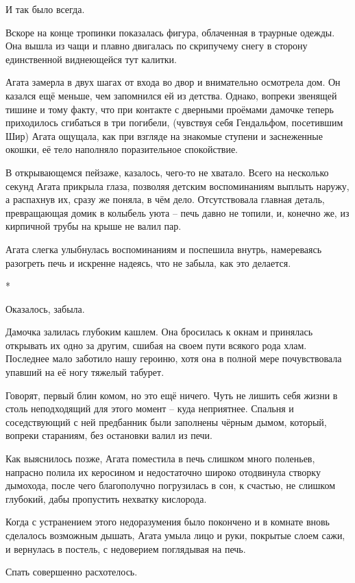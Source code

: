 \documentclass[
  a5paperpaper,
  DIV=11,
  numbers=noendperiod]{scrreprt}
\begin{document}
И так было всегда.

Вскоре на конце тропинки показалась фигура, облаченная в траурные
одежды. Она вышла из чащи и плавно двигалась по скрипучему снегу в
сторону единственной виднеющейся тут калитки.

Агата замерла в двух шагах от входа во двор и внимательно осмотрела дом.
Он казался ещё меньше, чем запомнился ей из детства. Однако, вопреки
звенящей тишине и тому факту, что при контакте с дверными проёмами
дамочке теперь приходилось сгибаться в три погибели, (чувствуя себя
Гендальфом, посетившим Шир) Агата ощущала, как при взгляде на знакомые
ступени и заснеженные окошки, её тело наполняло поразительное
спокойствие.

В открывающемся пейзаже, казалось, чего-то не хватало. Всего на
несколько секунд Агата прикрыла глаза, позволяя детским воспоминаниям
выплыть наружу, а распахнув их, сразу же поняла, в чём дело.
Отсутствовала главная деталь, превращающая домик в колыбель уюта -- печь
давно не топили, и, конечно же, из кирпичной трубы на крыше не валил
пар.

Агата слегка улыбнулась воспоминаниям и поспешила внутрь, намереваясь
разогреть печь и искренне надеясь, что не забыла, как это делается.

*

Оказалось, забыла.

Дамочка залилась глубоким кашлем. Она бросилась к окнам и принялась
открывать их одно за другим, сшибая на своем пути всякого рода хлам.
Последнее мало заботило нашу героиню, хотя она в полной мере
почувствовала упавший на её ногу тяжелый табурет.

Говорят, первый блин комом, но это ещё ничего. Чуть не лишить себя жизни
в столь неподходящий для этого момент -- куда неприятнее. Спальня и
соседствующий с ней предбанник были заполнены чёрным дымом, который,
вопреки стараниям, без остановки валил из печи.

Как выяснилось позже, Агата поместила в печь слишком много поленьев,
напрасно полила их керосином и недостаточно широко отодвинула створку
дымохода, после чего благополучно погрузилась в сон, к счастью, не
слишком глубокий, дабы пропустить нехватку кислорода.

Когда с устранением этого недоразумения было покончено и в комнате вновь
сделалось возможным дышать, Агата умыла лицо и руки, покрытые слоем
сажи, и вернулась в постель, с недоверием поглядывая на печь.

Спать совершенно расхотелось.
\end{document}
